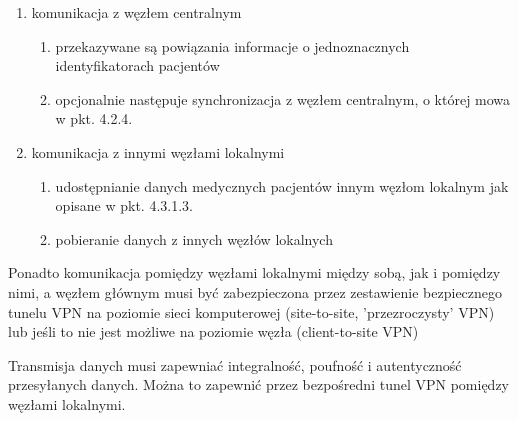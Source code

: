 \documentclass[a4paper]{report}
\begin{document}
\begin{enumerate}
\item komunikacja z węzłem centralnym
  \begin{enumerate}
  \item przekazywane są powiązania informacje o jednoznacznych identyfikatorach pacjentów
  \item opcjonalnie następuje synchronizacja z węzłem centralnym, o której mowa w pkt. 4.2.4.
  \end{enumerate}

\item komunikacja z innymi węzłami lokalnymi
  \begin{enumerate}
  \item udostępnianie danych medycznych pacjentów innym węzłom lokalnym jak opisane w pkt.  4.3.1.3.
  \item pobieranie danych z innych węzłów lokalnych
  \end{enumerate}
\end{enumerate}

Ponadto komunikacja pomiędzy węzłami lokalnymi między sobą, jak i pomiędzy nimi, a węzłem głównym musi być zabezpieczona przez zestawienie bezpiecznego tunelu VPN na poziomie sieci komputerowej (site-to-site, 'przezroczysty' VPN) lub jeśli to nie jest możliwe na poziomie węzła (client-to-site VPN)

Transmisja danych musi zapewniać integralność, poufność i autentyczność przesyłanych danych. Można to zapewnić przez bezpośredni tunel VPN pomiędzy węzłami lokalnymi.
\end{document}
